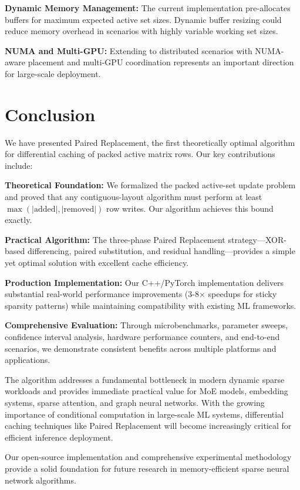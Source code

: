 \documentclass{article}
\numberwithin{equation}{section}
\theoremstyle{plain}
\theoremstyle{definition}
\theoremstyle{remark}
\begin{document}
\textbf{Dynamic Memory Management:} The current implementation pre-allocates buffers for maximum expected active set sizes. Dynamic buffer resizing could reduce memory overhead in scenarios with highly variable working set sizes.

\textbf{NUMA and Multi-GPU:} Extending to distributed scenarios with NUMA-aware placement and multi-GPU coordination represents an important direction for large-scale deployment.

\section{Conclusion} \label{sec:conclusion}

We have presented Paired Replacement, the first theoretically optimal algorithm for differential caching of packed active matrix rows. Our key contributions include:

\textbf{Theoretical Foundation:} We formalized the packed active-set update problem and proved that any contiguous-layout algorithm must perform at least $\max(|\text{added}|, |\text{removed}|)$ row writes. Our algorithm achieves this bound exactly.

\textbf{Practical Algorithm:} The three-phase Paired Replacement strategy—XOR-based differencing, paired substitution, and residual handling—provides a simple yet optimal solution with excellent cache efficiency.

\textbf{Production Implementation:} Our C++/PyTorch implementation delivers substantial real-world performance improvements (3-8$\times$ speedups for sticky sparsity patterns) while maintaining compatibility with existing ML frameworks.

\textbf{Comprehensive Evaluation:} Through microbenchmarks, parameter sweeps, confidence interval analysis, hardware performance counters, and end-to-end scenarios, we demonstrate consistent benefits across multiple platforms and applications.

The algorithm addresses a fundamental bottleneck in modern dynamic sparse workloads and provides immediate practical value for MoE models, embedding systems, sparse attention, and graph neural networks. With the growing importance of conditional computation in large-scale ML systems, differential caching techniques like Paired Replacement will become increasingly critical for efficient inference deployment.

Our open-source implementation and comprehensive experimental methodology provide a solid foundation for future research in memory-efficient sparse neural network algorithms.
\end{document}
